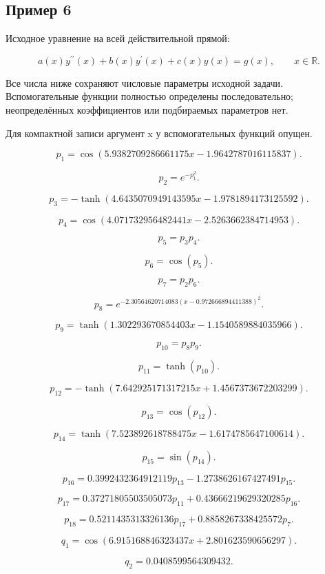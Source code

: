 \subsection*{Пример 6}

Исходное уравнение на всей действительной прямой:

\[a(x)y^{\prime\prime}(x)+b(x)y^\prime(x)+c(x)y(x)=g(x),\qquad x\in\mathbb R.\]

Все числа ниже сохраняют числовые параметры исходной задачи. Вспомогательные функции полностью определены последовательно; неопределённых коэффициентов или подбираемых параметров нет.

Для компактной записи аргумент x у вспомогательных функций опущен.

\[p_{1}=\cos{\left(5.9382709286661175 x - 1.9642787016115837 \right)}.\]

\[p_{2}=e^{- p_{1}^{2}}.\]

\[p_{3}=- \tanh{\left(4.6435070949143595 x - 1.9781894173125592 \right)}.\]

\[p_{4}=\cos{\left(4.071732956482441 x - 2.5263662384714953 \right)}.\]

\[p_{5}=p_{3} p_{4}.\]

\[p_{6}=\cos{\left(p_{5} \right)}.\]

\[p_{7}=p_{2} p_{6}.\]

\[p_{8}=e^{- 2.30564620714083 \left(x - 0.972666894411388\right)^{2}}.\]

\[p_{9}=\tanh{\left(1.302293670854403 x - 1.1540589884035966 \right)}.\]

\[p_{10}=p_{8} p_{9}.\]

\[p_{11}=\tanh{\left(p_{10} \right)}.\]

\[p_{12}=- \tanh{\left(7.642925171317215 x + 1.4567373672203299 \right)}.\]

\[p_{13}=\cos{\left(p_{12} \right)}.\]

\[p_{14}=\tanh{\left(7.523892618788475 x - 1.6174785647100614 \right)}.\]

\[p_{15}=\sin{\left(p_{14} \right)}.\]

\[p_{16}=0.3992432364912119 p_{13} - 1.2738626167427491 p_{15}.\]

\[p_{17}=0.37271805503505073 p_{11} + 0.43666219629320285 p_{16}.\]

\[p_{18}=0.5211435313326136 p_{17} + 0.8858267338425572 p_{7}.\]

\[q_{1}=\cos{\left(6.915168846323437 x + 2.801623590656297 \right)}.\]

\[q_{2}=0.0408599564309432.\]

